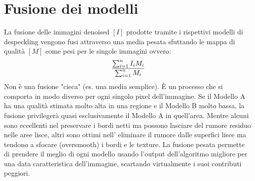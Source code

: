 \section{Fusione dei modelli}
La fusione delle immagini denoised $[I]$ prodotte tramite i rispettivi modelli di despeckling vengono fusi attraverso una media pesata sfuttando
le mappa di qualità $[M]$ come pesi per le singole immagini ovvero:
\begin{equation}
    \makebox[\textwidth][c]{%
      $\displaystyle
        \frac{\sum_{i=1}^{n} I_i M_i}{\sum_{i=1}^{n} M_i}
      $%
    }
\end{equation}
Non è una fusione "cieca" (es. una media semplice). È un processo che si 
comporta in modo diverso per ogni singolo pixel dell'immagine. Se il Modello A ha una qualità stimata 
molto alta in una regione e il Modello B molto bassa, la fusione privilegerà quasi esclusivamente 
il Modello A in quell'area. Mentre alcuni sono eccellenti nel preservare i bordi netti ma possono lasciare del rumore residuo nelle aree lisce, 
altri sono ottimi nell' eliminare il rumore dalle superfici lisce ma tendono a sfocare (oversmooth) i bordi e le texture.
La fusione pesata permette di prendere il meglio di ogni modello usando l'output dell'algoritmo migliore per una data 
caratteristica dell'immagine, scartando virtualmente i suoi contributi peggiori.
  
    
